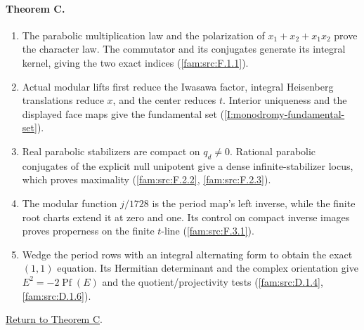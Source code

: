 \documentclass[11pt,a4paper]{article}
\theoremstyle{definition}
\begin{document}
\paragraph{Theorem C.}
\begin{enumerate}[label=\arabic*.]
\item\hypertarget{step-I-C-1}{} The parabolic multiplication law
and the polarization of $x_1+x_2+x_1x_2$ prove the character law.
The commutator and its conjugates generate its integral kernel,
giving the two exact indices
(\hyperref[fam:src:F.1.1]{\ref*{fam:src:F.1.1}}).
\item\hypertarget{step-I-C-2}{} Actual modular lifts first reduce
the Iwasawa factor, integral Heisenberg translations reduce $x$,
and the center reduces $t$.  Interior uniqueness and the displayed
face maps give the fundamental set
(\hyperref[I:monodromy-fundamental-set]{\ref*{I:monodromy-fundamental-set}}).
\item\hypertarget{step-I-C-3}{} Real parabolic stabilizers are
compact on $q_d\ne0$.  Rational parabolic conjugates of the
explicit null unipotent give a dense infinite-stabilizer locus,
which proves maximality
(\hyperref[fam:src:F.2.2]{\ref*{fam:src:F.2.2}},
\hyperref[fam:src:F.2.3]{\ref*{fam:src:F.2.3}}).
\item\hypertarget{step-I-C-4}{} The modular function $j/1728$
is the period map's left inverse, while the finite root charts
extend it at zero and one.  Its control on compact inverse
images proves properness on the finite $t$-line
(\hyperref[fam:src:F.3.1]{\ref*{fam:src:F.3.1}}).
\item\hypertarget{step-I-C-5}{} Wedge the period rows with an
integral alternating form to obtain the exact $(1,1)$ equation.
Its Hermitian determinant and the complex orientation give
$E^2=-2\operatorname{Pf}(E)$ and the quotient/projectivity tests
(\hyperref[fam:src:D.1.4]{\ref*{fam:src:D.1.4}},
\hyperref[fam:src:D.1.6]{\ref*{fam:src:D.1.6}}).
\end{enumerate}
\hyperlink{main-I-C}{Return to Theorem C}.

\hypertarget{outline-I-D}{}
\end{document}
